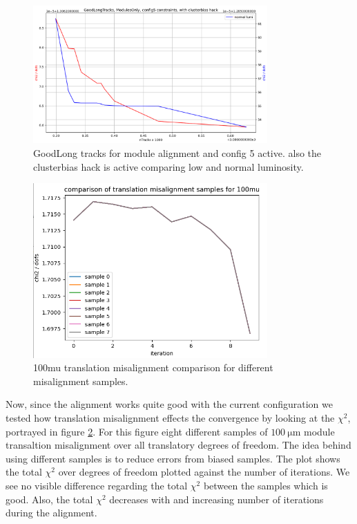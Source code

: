 \begin{figure}
  \centering
  \includegraphics[width=0.8\textwidth]{plots/feb_2_2022/GL_modules_c5_cb_hackactive_low_normal_lumi.png}
  \caption{GoodLong tracks for module alignment and config 5 active. also the clusterbias hack is active comparing low and normal luminosity.}
  \label{fig:GL_lumi_low_normal_hack_on}
\end{figure}

\begin{figure}
  \centering
  \includegraphics[width=0.8\textwidth]{plots/feb_6_2022/100mu_misalignment_samples_compared.png}
  \caption{100mu translation misalignment comparison for different misalignment samples.}
  \label{fig:100muT}
\end{figure}

Now, since the alignment works quite good with the current configuration we
tested how translation misalignment effects the convergence by looking at the
$\chi^2$, portrayed in figure \ref{fig:100muT}. For this figure eight different samples of $\SI{100}{\micro\metre}$ module transaltion misalignment over all translatory
degrees of freedom. The idea behind using different samples is to reduce errors
from biased samples. The plot shows the total $\chi^2$ over degrees of freedom
plotted against the number of iterations. We see no visible difference regarding
the total $\chi^2$ between the samples which is good.
Also, the total $\chi^2$ decreases with and increasing number of iterations
during the alignment.

